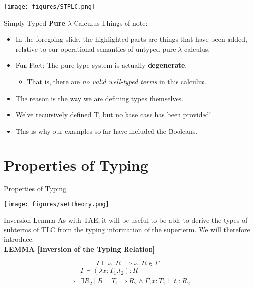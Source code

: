 \documentclass[11pt]{beamer}
\begin{document}
\begin{frame}[fragile=singleslide]{}
\begin{center}
\texttt{[image: figures/STPLC.png]}
\end{center}

\end{frame}


\begin{frame}[fragile=singleslide]{Simply Typed \textbf{Pure} $\lambda$-Calculus}
Things of note:
\begin{itemize}
\item In the foregoing slide, the highlighted parts are things that have been added, relative to our operational semantics of untyped pure $\lambda$ calculus.  
\item Fun Fact: The pure type system is actually \textbf{degenerate}.
\begin{itemize}
\item That is, there are \emph{no valid well-typed terms} in this calculus.  
\end{itemize}
\item The reason is the way we are defining types themselves.
\item We've recursively defined T, but no base case has been provided! 
\item This is why our examples so far have included the Booleans. 
\end{itemize}
\end{frame}


\section[Properties]{Properties of Typing}
\begin{frame}[fragile=singleslide]{Properties of Typing}
\begin{center}
\texttt{[image: figures/settheory.png]}
\end{center}
\end{frame}


\begin{frame}[fragile=singleslide]{Inversion Lemma}
As with TAE, it will be useful to be able to derive the types of subterms of TLC from the typing information of the superterm.  We will therefore introduce: \\
\vspace{1em}
\textbf{LEMMA [Inversion of the Typing Relation]}

\begin{equation}
\Gamma \vdash x : R \implies x : R \in \Gamma \tag{I-Var}
\end{equation}
\vspace{0em}
\begin{equation}
\begin{split}
& \Gamma \vdash (\lambda x : T_1. t_2) : R \\
\implies & \exists R_2 \:|\: R = T_1 \Rightarrow R_2 \land \Gamma , x : T_1 \vdash t_2 : R_2
\end{split} \tag{I-Abs}
\end{equation}

\end{frame}
\end{document}
